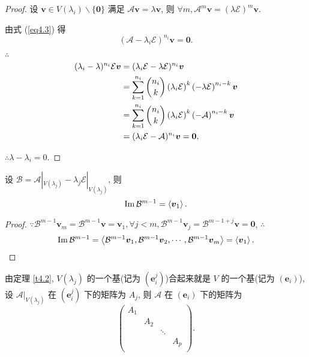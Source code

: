 \documentclass{ctexart}
\begin{document}
\begin{proof}
    设 $\boldsymbol{v}\in V(\lambda_i)\backslash\{\boldsymbol{0}\}$ 满足 $\mathcal{A}\boldsymbol{v}=\lambda\boldsymbol{v}$, 则 $\forall m,\mathcal{A}^m\boldsymbol{v}=(\lambda\mathcal{E})^m\boldsymbol{v}$.

    由式 (\ref{eq4.3}) 得
    \[(\mathcal{A}-\lambda_i\mathcal{E})^{n_i}\boldsymbol{v}=\boldsymbol{0}.\]

    $\therefore$
    \begin{align*}
        (\lambda_i-\lambda)^{n_i}\mathcal{E}\boldsymbol{v} & =(\lambda_i\mathcal{E}-\lambda\mathcal{E})^{n_i}\boldsymbol{v} \\
        & =\sum\limits_{k=1}^{n_i}\dbinom{n_i}{k}\left(\lambda_i\mathcal{E}\right)^k\left(-\lambda\mathcal{E}\right)^{n_i-k}\boldsymbol{v} \\
        & =\sum\limits_{k=1}^{n_i}\dbinom{n_i}{k}\left(\lambda_i\mathcal{E}\right)^k\left(-\mathcal{A}\right)^{n_i-k}\boldsymbol{v} \\
        & =(\lambda_i\mathcal{E}-\mathcal{A})^{n_i}\boldsymbol{v}=\boldsymbol{0},
    \end{align*}

    $\therefore\lambda-\lambda_i=0$.
\end{proof}
\begin{corollary}
    设 $\mathcal{B}=\mathcal{A}|_{V(\lambda_j)}-\lambda_j\mathcal{E}|_{V(\lambda_j)}$, 则
    \[\operatorname{Im} \mathcal{B}^{m-1}=\left<\boldsymbol{v}_1\right>.\]
\end{corollary}
\begin{proof}
    $\because\mathcal{B}^{m-1}\boldsymbol{v}_m=\mathcal{B}^{m-1}\boldsymbol{v}=\boldsymbol{v}_1,\forall j<m,\mathcal{B}^{m-1}\boldsymbol{v}_j=\mathcal{B}^{m-1+j}\boldsymbol{v}=\boldsymbol{0}$, $\therefore$
    \[\operatorname{Im} \mathcal{B}^{m-1}=\left<\mathcal{B}^{m-1}\boldsymbol{v}_1,\mathcal{B}^{m-1}\boldsymbol{v}_2,\cdots,\mathcal{B}^{m-1}\boldsymbol{v}_m\right>=\left<\boldsymbol{v}_1\right>.\qedhere\]
\end{proof}
由定理 \ref{t4.2}, $V(\lambda_j)$ 的一个基(记为 $(\boldsymbol{e}^j_i)$)合起来就是 $V$ 的一个基(记为 $(\boldsymbol{e}_i)$), 设 $\mathcal{A}|_{V(\lambda_j)}$ 在 $(\boldsymbol{e}^j_i)$ 下的矩阵为 $A_j$, 则 $\mathcal{A}$ 在 $(\boldsymbol{e}_i)$ 下的矩阵为
\[\begin{pmatrix}
    A_1 \\
    & A_2 \\
    && \ddots \\
    &&& A_p \\
\end{pmatrix}.\]
\end{document}
